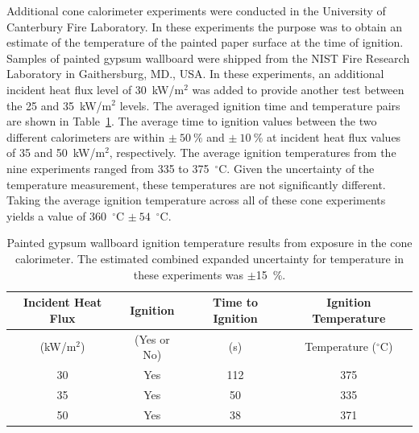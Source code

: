 \documentclass[twoside]{uocthesis}
\begin{document}
{Additional cone calorimeter experiments were conducted in the University of Canterbury Fire Laboratory.  In these experiments the purpose was to obtain an estimate of the temperature of the painted paper surface at the time of ignition.   Samples of painted gypsum wallboard were shipped from the NIST Fire Research Laboratory in Gaithersburg, MD., USA.  In these experiments, an additional incident heat flux level of 30~kW/m$^2$ was added to provide another test between the 25 and 35~kW/m$^2$ levels.  The averaged ignition time and temperature pairs are shown in Table~\ref{tab:Gypsum_wallboard_igntemp}.  The average time to ignition values between the two different calorimeters are within $\pm~50~\%$ and $\pm~10~\%$ at incident heat flux values of 35 and 50~kW/m$^2$, respectively.  The average ignition temperatures from the nine experiments ranged from 335 to 375~$^{\circ}$C.  Given the uncertainty of the temperature measurement, these temperatures are not significantly different.  Taking the average ignition temperature across all of these cone experiments yields a value of 360~$^{\circ}$C $\pm~54$~$^{\circ}$C.  
          
\begin{table}
	\centering
	\begin{tabular}{|c|c|c|c|}
		\hline Incident Heat Flux & Ignition & Time to Ignition & Ignition Temperature \\
		\hline (kW/m$^2$) & (Yes or No) & (s)  & Temperature ($^{\circ}$C)   \\ \hline
		\hline 30 	& Yes 	& 112	& 375 	 \\
		\hline 35	& Yes 	& 50 	& 335 	 \\
		\hline 50	& Yes 	& 38 	& 371 	 \\
		\hline
	\end{tabular}
	\caption[Painted gypsum wallboard ignition temperature results]{Painted gypsum wallboard ignition temperature results from exposure in the cone calorimeter.  The estimated combined expanded uncertainty for temperature in these experiments was $\pm$15~\%.}
	\label{tab:Gypsum_wallboard_igntemp}
\end{table}

}
\end{document}
